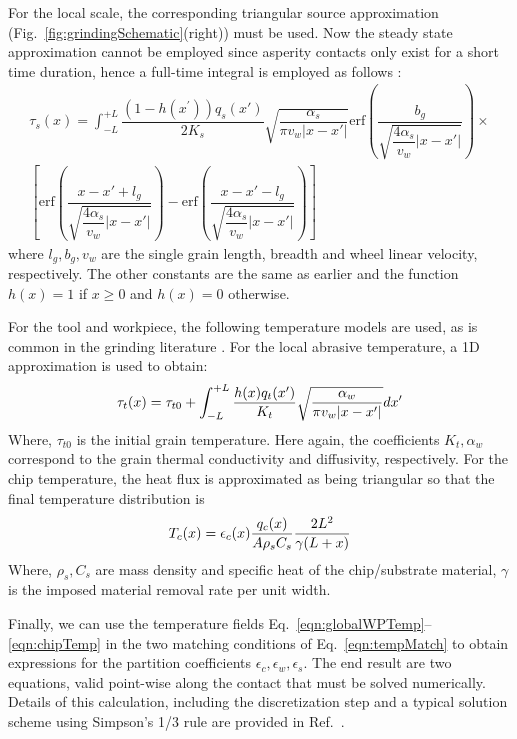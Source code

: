 \documentclass[11pt]{article}
\newcommand{\erf}{\ensuremath{\text{erf}}}
\begin{document}
For the local scale, the corresponding triangular source approximation (Fig.~\ref{fig:grindingSchematic}(right)) must be used. Now the steady state approximation cannot be employed since asperity contacts only exist for a short time duration, hence a full-time integral is employed as follows \cite{jaeger1942moving}:
\begin{equation}
  \label{eqn:localWPTemp}
  \begin{aligned}
\tau_s(x)=\int_{-L}^{+L} \dfrac{(1 - h(x^\prime))q_{s}(x')}{2 K_{s}}\sqrt{\dfrac{\alpha_{s}}{\pi v_{w} |x-x'|}} \erf \left(\dfrac{b_{g}}{\sqrt{\dfrac{4\alpha_{s}}{ v_{w} }|x-x'|}}\right)\times\\
\left[\erf \left(\dfrac{x-x'+l_{g}}{\sqrt{\dfrac{4\alpha_{s}}{ v_{w} }|x-x'|}}\right)-\erf \left(\dfrac{x-x'-l_{g}}{\sqrt{\dfrac{4\alpha_{s}}{ v_{w} }|x-x'|}}\right)\right]
\end{aligned}
\end{equation}
where $l_g, b_g, v_w$ are the single grain length, breadth and wheel linear velocity, respectively. The other constants are the same as earlier and the function $h(x) = 1$ if $x\geq 0$ and $h(x) = 0$ otherwise.


For the tool and workpiece, the following temperature models are used, as is common in the grinding literature \cite{DhamiJOM}. For the local abrasive temperature, a 1D approximation is used to obtain: 
\begin{equation}{\label{eqn:grainTemp}}
 \tau_{t}(x)=\tau_{t0}+\int_{-L}^{+L} \dfrac{h(x)q_{t}(x')}{ K_{t}}\sqrt{\dfrac{\alpha_{w}}{\pi v_{w} |x-x'|}}dx'
\end{equation}
Where, $\tau_{t0}$ is the initial grain temperature. Here again, the coefficients $K_t, \alpha_w$ correspond to the grain thermal conductivity and diffusivity, respectively. For the chip temperature, the heat flux is approximated as being triangular so that the final temperature distribution is
\begin{equation}{\label{eqn:chipTemp}}
  T_{c}(x)=\epsilon_c(x) \dfrac{q_{c}(x)}{A \rho_{s} C_{s}}\dfrac{2 L^2}{\gamma (L+x)}
\end{equation}
Where, $\rho_{s}, C_s$ are mass density and specific heat of the chip/substrate material, $\gamma$ is the imposed material removal rate per unit width.

Finally, we can use the temperature fields Eq.~\ref{eqn:globalWPTemp}--\ref{eqn:chipTemp} in the two matching conditions of Eq.~\ref{eqn:tempMatch} to obtain expressions for the partition coefficients $\epsilon_c, \epsilon_w, \epsilon_s$. The end result are two equations, valid point-wise along the contact that must be solved numerically. Details of this calculation, including the discretization step and a typical solution scheme using Simpson's 1/3 rule are provided in Ref.~\cite{DhamiJOM}.
\end{document}
